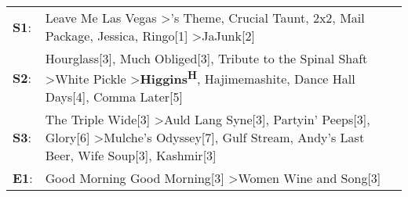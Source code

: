 \begin{supertabular}{p{0.03\textwidth}p{0.92\textwidth}}
 \textbf{S1}:  &                                                                               Leave Me Las Vegas\textsuperscript{} \textgreater {}'s Theme\textsuperscript{}, \enspace Crucial Taunt\textsuperscript{}, \enspace 2x2\textsuperscript{}, \enspace Mail Package\textsuperscript{}, \enspace Jessica\textsuperscript{}, \enspace Ringo[1]\textsuperscript{} \textgreater \enspace JaJunk[2]\textsuperscript{}  \enspace  \\
 \textbf{S2}:  &                               Hourglass[3]\textsuperscript{}, \enspace Much Obliged[3]\textsuperscript{}, \enspace Tribute to the Spinal Shaft\textsuperscript{} \textgreater \enspace White Pickle\textsuperscript{} \textgreater \enspace \textbf{Higgins\textsuperscript{H}}, \enspace Hajimemashite\textsuperscript{}, \enspace Dance Hall Days[4]\textsuperscript{}, \enspace Comma Later[5]\textsuperscript{}  \enspace  \\
 \textbf{S3}:  &  The Triple Wide[3]\textsuperscript{} \textgreater \enspace Auld Lang Syne[3]\textsuperscript{}, \enspace Partyin' Peeps[3]\textsuperscript{}, \enspace Glory[6]\textsuperscript{} \textgreater \enspace Mulche's Odyssey[7]\textsuperscript{}, \enspace Gulf Stream\textsuperscript{}, \enspace Andy's Last Beer\textsuperscript{}, \enspace Wife Soup[3]\textsuperscript{}, \enspace Kashmir[3]\textsuperscript{}  \enspace  \\
 \textbf{E1}:  &                                                                                                                                                                                                                                                                                                       Good Morning Good Morning[3]\textsuperscript{} \textgreater \enspace Women Wine and Song[3]\textsuperscript{}  \enspace  \\
\end{supertabular}
